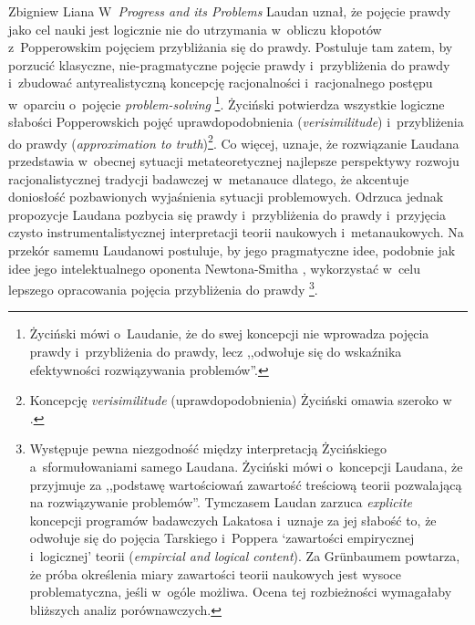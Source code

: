 \begin{artplenv}{Zbigniew Liana}
W~\textit{Progress and its Problems} Laudan
\parencite*[][]{laudan_progress_1977} %
 uznał, że pojęcie prawdy jako cel nauki jest logicznie nie do utrzymania w~obliczu kłopotów z~Popperowskim pojęciem przybliżania się do prawdy. Postuluje tam zatem, by porzucić klasyczne, nie-pragmatyczne pojęcie prawdy i~przybliżenia do prawdy i~zbudować antyrealistyczną koncepcję racjonalności i~racjonalnego postępu w~oparciu o~pojęcie \textit{problem-solving} 
\parencite[][s.~109.121--125]{laudan_progress_1977}%
\footnote{Życiński 
\parencite*[][s.~203]{zycinski_teizm_1985} %
 mówi o~Laudanie, że do swej koncepcji nie wprowadza pojęcia prawdy i~przybliżenia do prawdy, lecz ,,odwołuje się do wskaźnika efektywności rozwiązywania problemów''.}. Życiński potwierdza wszystkie logiczne słabości Popperowskich pojęć uprawdopodobnienia (\textit{verisimilitude}) i~przybliżenia do prawdy (\textit{approximation to truth})\footnote{Koncepcję \textit{verisimilitude} (uprawdopodobnienia) Życiński omawia szeroko w~
\parencites*[][s.~110–119]{zycinski_elementy_1996}[][s.~147–160]{zycinski_elementy_2015}.%
}. Co więcej, uznaje, że rozwiązanie Laudana przedstawia w~obecnej sytuacji metateoretycznej najlepsze perspektywy rozwoju racjonalistycznej tradycji badawczej w~metanauce dlatego, że akcentuje doniosłość pozbawionych wyjaśnienia sytuacji problemowych. Odrzuca jednak propozycje Laudana pozbycia się prawdy i~przybliżenia do prawdy i~przyjęcia czysto instrumentalistycznej interpretacji teorii naukowych i~metanaukowych. Na przekór samemu Laudanowi postuluje, by jego pragmatyczne idee, podobnie jak idee jego intelektualnego oponenta Newtona-Smitha 
\parencite*[][]{newton-smith_rationality_1981}, %
 wykorzystać w~celu lepszego opracowania pojęcia przybliżenia do prawdy 
\parencites[][s.~117n]{zycinski_elementy_1996}[][s.~156nn]{zycinski_elementy_2015}%
\footnote{Występuje pewna niezgodność między interpretacją Życińskiego a~sformułowaniami samego Laudana. Życiński mówi 
\parencites*[][s.~117]{zycinski_elementy_1996}[][s.~156]{zycinski_elementy_2015} %
 o~koncepcji Laudana, że przyjmuje za ,,podstawę wartościowań zawartość treściową teorii pozwalającą na rozwiązywanie problemów''. Tymczasem Laudan 
\parencite*[][s.~77]{laudan_progress_1977} %
 zarzuca \textit{explicite} koncepcji programów badawczych Lakatosa i~uznaje za jej słabość to, że odwołuje się do pojęcia Tarskiego i~Poppera ‘zawartości empirycznej i~logicznej' teorii (\textit{empircial and logical content}). Za Grünbaumem powtarza, że próba określenia miary zawartości teorii naukowych jest wysoce problematyczna, jeśli w~ogóle możliwa. Ocena tej rozbieżności wymagałaby bliższych analiz porównawczych.}.


\end{artplenv}
